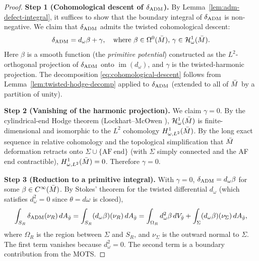 \begin{proof}
\textbf{Step 1 (Cohomological descent of $\delta_{\mathrm{ADM}}$).} By Lemma~\ref{lem:adm-defect-integral}, it suffices to show that the boundary integral of $\delta_{\mathrm{ADM}}$ is non-negative. We claim that $\delta_{\mathrm{ADM}}$ admits the twisted cohomological descent:
\begin{equation}\label{eq:cohomological-descent}
\delta_{\mathrm{ADM}} = d_{\omega} \beta + \gamma, \quad \text{where } \beta \in \Omega^0(\bar{M}), \, \gamma \in \mathcal{H}^1_{\omega}(\bar{M}).
\end{equation}
Here $\beta$ is a smooth function (the \emph{primitive potential}) constructed as the $L^2$-orthogonal projection of $\delta_{\mathrm{ADM}}$ onto $\operatorname{im}(d_{\omega})$, and $\gamma$ is the twisted-harmonic projection. The decomposition \eqref{eq:cohomological-descent} follows from Lemma~\ref{lem:twisted-hodge-decomp} applied to $\delta_{\mathrm{ADM}}$ (extended to all of $\bar{M}$ by a partition of unity).

\textbf{Step 2 (Vanishing of the harmonic projection).} We claim $\gamma = 0$. By the cylindrical-end Hodge theorem (Lockhart--McOwen \cite{lockhartmccowen1985}), $\mathcal{H}^1_{\omega}(\bar{M})$ is finite-dimensional and isomorphic to the $L^2$ cohomology $H^1_{\omega, L^2}(\bar{M})$. By the long exact sequence in relative cohomology and the topological simplification that $\bar{M}$ deformation retracts onto $\Sigma \cup \{\mathrm{AF\ end}\}$ (with $\Sigma$ simply connected and the AF end contractible), $H^1_{\omega, L^2}(\bar{M}) = 0$. Therefore $\gamma = 0$.

\textbf{Step 3 (Reduction to a primitive integral).} With $\gamma = 0$, $\delta_{\mathrm{ADM}} = d_{\omega} \beta$ for some $\beta \in C^\infty(\bar{M})$. By Stokes' theorem for the twisted differential $d_{\omega}$ (which satisfies $d_{\omega}^2 = 0$ since $\theta = d\omega$ is closed),
\begin{equation}
\int_{S_R} \delta_{\mathrm{ADM}}(\nu_R) \, dA_{\bar{g}} = \int_{S_R} (d_{\omega}\beta)(\nu_R) \, dA_{\bar{g}} = \int_{\Omega_R} d_{\omega}^2 \beta \, dV_{\bar{g}} + \int_{\Sigma} (d_{\omega}\beta)(\nu_\Sigma) \, dA_{\bar{g}},
\end{equation}
where $\Omega_R$ is the region between $\Sigma$ and $S_R$, and $\nu_\Sigma$ is the outward normal to $\Sigma$. The first term vanishes because $d_{\omega}^2 = 0$. The second term is a boundary contribution from the MOTS.


\end{proof}
